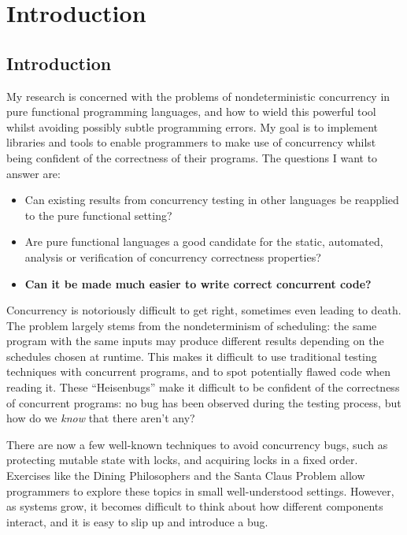 \part{Introduction}


\chapter{Introduction}
\label{chp:intro}

My research is concerned with the problems of nondeterministic
concurrency in pure functional programming languages, and how to wield
this powerful tool whilst avoiding possibly subtle programming
errors. My goal is to implement libraries and tools to enable
programmers to make use of concurrency whilst being confident of the
correctness of their programs. The questions I want to answer are:

\begin{itemize}
  \item Can existing results from concurrency testing in other
    languages be reapplied to the pure functional setting?

  \item Are pure functional languages a good candidate for the static,
    automated, analysis or verification of concurrency correctness
    properties?

  \item \textbf{Can it be made much easier to write correct concurrent
      code?}
\end{itemize}

Concurrency is notoriously difficult to get right\cite{overrated},
sometimes even leading to death\cite{therac25}. The problem largely
stems from the nondeterminism of scheduling: the same program with the
same inputs may produce different results depending on the schedules
chosen at runtime. This makes it difficult to use traditional testing
techniques with concurrent programs, and to spot potentially flawed
code when reading it. These ``Heisenbugs'' make it difficult to be
confident of the correctness of concurrent programs: no bug has been
observed during the testing process, but how do we \textit{know} that
there aren't any?

There are now a few well-known techniques to avoid concurrency bugs,
such as protecting mutable state with locks, and acquiring locks in a
fixed order. Exercises like the Dining
Philosophers\cite{diningphilosophers} and the Santa Claus
Problem\cite{santaclaus} allow programmers to explore these topics in
small well-understood settings. However, as systems grow, it becomes
difficult to think about how different components interact, and it is
easy to slip up and introduce a bug.

